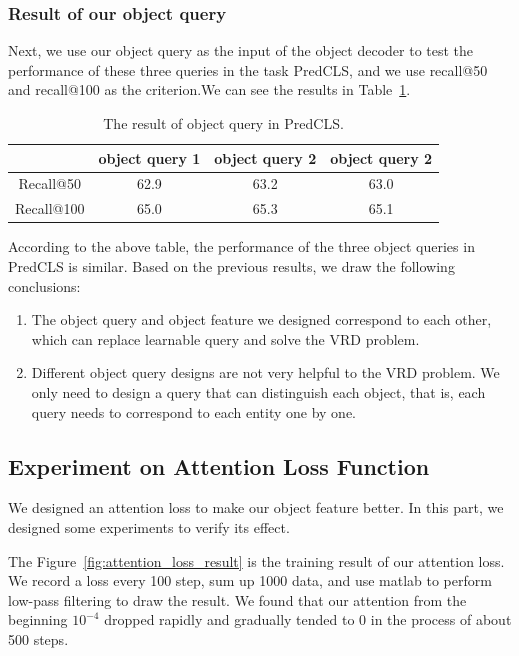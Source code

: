 \subsubsection{Result of our object query}
Next, we use our object query as the input of the object decoder to test the performance of these three queries in the task PredCLS, and we use recall@50 and recall@100 as the criterion.We can see the results in Table~\ref{tab:result_object _query}.

\begin{table}[!h]
	\centering
	\begin{tabular}{c|ccc}
		\hline
		& object query 1 & object query 2 & object query 2 \\ \hline
		Recall@50  & 62.9            & 63.2            & 63.0              \\
		Recall@100 & 65.0             & 65.3              & 65.1              \\ \hline
	\end{tabular}

\caption[The result of object query in PredCLS]{The result of object query in PredCLS.}
\label{tab:result_object _query}
\end{table}

According to the above table, the performance of the three object queries in PredCLS is similar. Based on the previous results, we draw the following conclusions:

\begin{enumerate}
	\item The object query and object feature we designed correspond to each other, which can replace learnable query and solve the VRD problem.
	\item Different object query designs are not very helpful to the VRD problem. We only need to design a query that can distinguish each object, that is, each query needs to correspond to each entity one by one.
\end{enumerate}


\subsection{Experiment on Attention  Loss Function}

We designed an attention loss to make our object feature better. In this part, we designed some experiments to verify its effect.

The Figure~\ref{fig:attention_loss_result} is the training result of our attention loss. We record a loss every 100 step, sum up 1000 data, and use matlab to perform low-pass filtering to draw the result. We found that our attention from the beginning $ 10^{-4} $ dropped rapidly and gradually tended to 0 in the process of about 500 steps.

